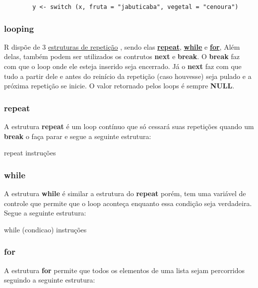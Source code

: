         \color{blue}
        \begin{verbatim}
        y <- switch (x, fruta = "jabuticaba", vegetal = "cenoura")
        \end{verbatim}
		\color{black}
      \subsubsection{looping}  
      
        R dispõe de 3 \href{https://cran.r-project.org/doc/manuals/r-release/R-lang.html#Looping}{estruturas de repetição} \cite{Team2021b}, sendo elas \href{https://cran.r-project.org/doc/manuals/r-release/R-lang.html#repeat}{\textbf{repeat}}, \href{https://cran.r-project.org/doc/manuals/r-release/R-lang.html#while}{\textbf{\textbf{while}}} e \href{https://cran.r-project.org/doc/manuals/r-release/R-lang.html#for}{\textbf{\textbf{for}}}, Além delas, também podem ser utilizados os contrutos \textbf{next} e \textbf{break}. O \textbf{break} faz com que o loop onde ele esteja inserido seja encerrado. Já o \textbf{next} faz com que tudo a partir dele e antes do reinício da repetição (caso houvesse) seja pulado e a próxima repetição se inicie. O valor retornado pelos loops é sempre \textbf{NULL}.
      \subsubsection{repeat}
          A estrutura \textbf{repeat} é um loop contínuo que só cessará suas repetições quando um \textbf{break} o faça parar e segue a seguinte estrutura:
          
        repeat {instruções}
      \subsubsection{while}
        A estrutura \textbf{while} é similar a estrutura do \textbf{repeat} porém, tem uma variável de controle que permite que o loop aconteça enquanto essa condição seja verdadeira. Segue a seguinte estrutura:
        
        while (condicao) {instruções}
      \subsubsection{for}
        A estrutura \textbf{for} permite que todos os elementos de uma lista sejam percorridos seguindo a seguinte estrutura:
              
